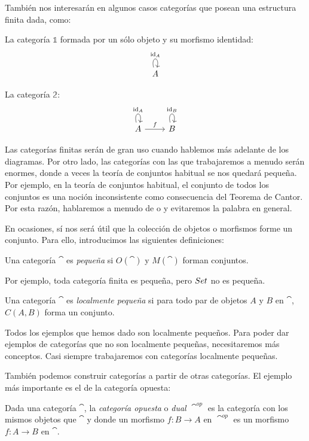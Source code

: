 También nos interesarán en algunos casos categorías que posean una estructura finita dada, como:
\begin{example}
La categoría $\mathbb{1}$ formada por un sólo objeto y su morfismo identidad:
\[ \begin{tikzcd}
A \arrow[loop above,"\id_A"]
\end{tikzcd}\]
\end{example}

\begin{example}
La categoría $\mathbb{2}$:
\[ \begin{tikzcd}
A \arrow[loop above,"\id_A"] \arrow[r,"f"] & B \arrow[loop above,"\id_B"]
\end{tikzcd}\]
\end{example}

Las categorías finitas serán de gran uso cuando hablemos más adelante de los diagramas.
Por otro lado, las categorías con las que trabajaremos a menudo serán enormes, donde a veces la teoría de conjuntos habitual se nos quedará pequeña.
Por ejemplo, en la teoría de conjuntos habitual, el conjunto de todos los conjuntos es una noción inconsistente como consecuencia del Teorema de Cantor.
Por esta razón, hablaremos a menudo de  o  y evitaremos la palabra  en general.

En ocasiones, sí nos será útil que la colección de objetos o morfismos forme un conjunto.
Para ello, introducimos las siguientes definiciones:

\begin{definition}
Una categoría $\cat$ es \emph{pequeña} si $O(\cat)$ y $M(\cat)$ forman conjuntos.
\end{definition}

Por ejemplo, toda categoría finita es pequeña, pero ${Set}$ no es pequeña.

\begin{definition}
Una categoría $\cat$ es \emph{localmente pequeña} si para todo par de objetos $A$ y $B$ en $\cat$, $C(A,B)$ forma un conjunto.
\end{definition}

Todos los ejemplos que hemos dado son localmente pequeños.
Para poder dar ejemplos de categorías que no son localmente pequeñas, necesitaremos más conceptos.
Casi siempre trabajaremos con categorías localmente pequeñas.

También podemos construir categorías a partir de otras categorías.
El ejemplo más importante es el de la categoría opuesta:
\begin{definition}
Dada una categoría $\cat$, la \emph{categoría opuesta} o \emph{dual} $\cat^{op}$ es la categoría con los mismos objetos que $\cat$ y donde un morfismo $f \colon B \to A$ en $\cat^{op}$ es un morfismo $f \colon A \to B$ en $\cat$.
\end{definition}

